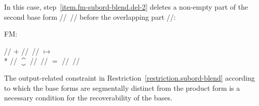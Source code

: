 \documentclass[output=paper
  ,nobabel
  ,draftmode
  ,colorlinks, citecolor=brown
]{langscibook}
\begin{document}
In this case, step \ref{item.fm-subord-blend.del-2} deletes a non-empty part of the second
base form // // before the overlapping part //: \begin{exe}
\ex \raggedright
\begin{labeledlist}{FM:}
\item[FM:] \raggedright // $+$ // // $↦$\\*{}
// $⁐$ // // $=$ // //
\end{labeledlist}
\end{exe}
The output-related constraint in Restriction \ref{restriction.subord-blend} according to which the base forms are
segmentally distinct from the product form is a necessary condition for the
recoverability of the bases.
\end{document}
